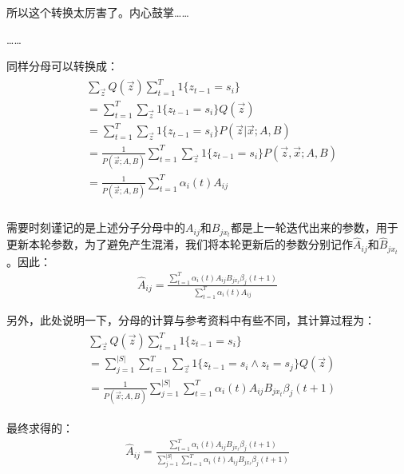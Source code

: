 所以这个转换太厉害了。内心鼓掌……

……

同样分母可以转换成：
\begin{align}
\begin{split}
 &\sum_{\vec{z}}Q(\vec{z})\sum_{t=1}^{T}1\{z_{t-1}=s_i\} \\
 &=\sum_{t=1}^{T} \sum_{\vec{z}} 1\{z_{t-1}=s_i\}Q(\vec{z}) \\
 &=\sum_{t=1}^{T} \sum_{\vec{z}} 1\{z_{t-1}=s_i\}P(\vec{z}|\vec{x};A,B) \\ 
 &=\frac{1}{P(\vec{x};A,B)} \sum_{t=1}^{T} \sum_{\vec{z}} 1\{z_{t-1}=s_i\}P(\vec{z},\vec{x};A,B) \\
 &=\frac{1}{P(\vec{x};A,B)} \sum_{t=1}^{T} \alpha_{i}(t)A_{ij} \\
\end{split}
\end{align}

需要时刻谨记的是上述分子分母中的$A_{ij}$和$B_{jx_{t}}$都是上一轮迭代出来的参数，用于更新本轮参数，为了避免产生混淆，我们将本轮更新后的参数分别记作$\hat{A}_{ij}$和$\hat{B}_{jx_{t}}$。因此：
\begin{align}
 \hat{A}_{ij} = \frac{\sum_{t=1}^{T} \alpha_{i}(t)A_{ij}B_{jx_{t}}\beta_{j}(t+1)}{\sum_{t=1}^{T} \alpha_{i}(t)A_{ij}}
\end{align}

另外，此处说明一下，分母的计算与参考资料中有些不同，其计算过程为：
\begin{align}
\begin{split}
 &\sum_{\vec{z}}Q(\vec{z})\sum_{t=1}^{T}1\{z_{t-1}=s_i\} \\
 &=\sum_{j=1}^{|S|} \sum_{t=1}^{T} \sum_{\vec{z}} 1\{z_{t-1}=s_i\wedge{z_t=s_j}\}Q(\vec{z}) \\
 &=\frac{1}{P(\vec{x};A,B)} \sum_{j=1}^{|S|}\sum_{t=1}^{T} \alpha_{i}(t)A_{ij}B_{jx_{t}}\beta_{j}(t+1)
\end{split}
\end{align}

最终求得的：
\begin{align}
 \hat{A}_{ij} = \frac{\sum_{t=1}^{T} \alpha_{i}(t)A_{ij}B_{jx_{t}}\beta_{j}(t+1)}{\sum_{j=1}^{|S|}\sum_{t=1}^{T} \alpha_{i}(t)A_{ij}B_{jx_{t}}\beta_{j}(t+1)}
\end{align}

